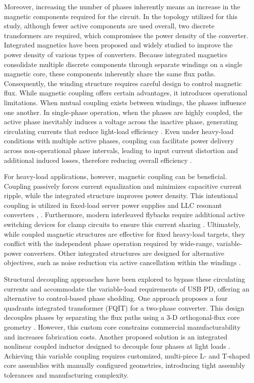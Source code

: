 \documentclass[lettersize,journal]{IEEEtran}
\begin{document}
Moreover, increasing the number of phases inherently means an increase in the magnetic components required for the circuit. In the topology utilized for this study, although fewer active components are used overall, two discrete transformers are required, which compromises the power density of the converter. Integrated magnetics have been proposed and widely studied to improve the power density of various types of converters. Because integrated magnetics consolidate multiple discrete components through separate windings on a single magnetic core, these components inherently share the same flux paths. Consequently, the winding structure requires careful design to control magnetic flux. While magnetic coupling offers certain advantages, it introduces operational limitations. When mutual coupling exists between windings, the phases influence one another. In single-phase operation, when the phases are highly coupled, the active phase inevitably induces a voltage across the inactive phase, generating circulating currents that reduce light-load efficiency \cite{Yang_2020, Z_Li_2025}. Even under heavy-load conditions with multiple active phases, coupling can facilitate power delivery across non-operational phase intervals, leading to input current distortion and additional induced losses, therefore reducing overall efficiency \cite{Yang_2020}.

For heavy-load applications, however, magnetic coupling can be beneficial. Coupling passively forces current equalization and minimizes capacitive current ripple, while the integrated structure improves power density. This intentional coupling is utilized in fixed-load server power supplies and LLC resonant converters \cite{Ahmad}, \cite{Dou, Nakakohara}. Furthermore, modern interleaved flybacks require additional active switching devices for clamp circuits to ensure this current sharing \cite{Z_Chen_s42835}. Ultimately, while coupled magnetic structures are effective for fixed heavy-load targets, they conflict with the independent phase operation required by wide-range, variable-power converters. Other integrated structures are designed for alternative objectives, such as noise reduction via active cancellation within the windings \cite{Jin_2024}.

Structural decoupling approaches have been explored to bypass these circulating currents and accommodate the variable-load requirements of USB PD, offering an alternative to control-based phase shedding. One approach proposes a four quadrants integrated transformer (FQIT) for a two-phase converter. This design decouples phases by separating the flux paths using a 3-D orthogonal-flux core geometry \cite{Ouyang}. However, this custom core constrains commercial manufacturability and increases fabrication costs. Another proposed solution is an integrated nonlinear coupled inductor designed to decouple four phases at light loads \cite{Z_Li_2025}. Achieving this variable coupling requires customized, multi-piece L- and T-shaped core assemblies with manually configured geometries, introducing tight assembly tolerances and manufacturing complexity.
\end{document}
